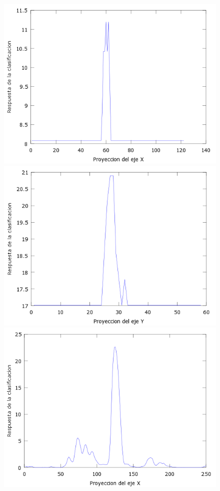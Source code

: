 \begin{figure}[htc]
  \centering
  \includegraphics[scale=.4]{images/plots/boost8X}
  \includegraphics[scale=.4]{images/plots/boost8Y}
  \includegraphics[scale=.4]{images/plots/svm8X}

\end{figure}
